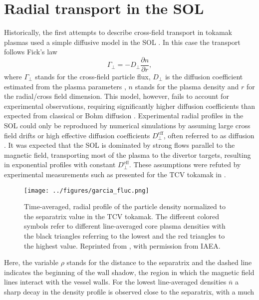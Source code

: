 \section{Radial transport in the SOL}
Historically, the first attempts to describe cross-field transport in tokamak plasmas
used a simple diffusive model in the SOL \cite{connor1999comparison}. In this case the
transport follows Fick's law
\begin{equation}
  \Gamma_\perp = - D_\perp \frac{\partial n}{\partial r},
\end{equation}
%
where $\Gamma_\perp$ stands for the cross-field particle flux, $D_\perp$ is the
diffusion coefficient estimated from the plasma parameters \cite{Bohm1949}, $n$ stands
for the plasma density and $r$ for the radial/cross field dimension. This model,
however, fails to account for experimental observations, requiring significantly higher
diffusion coefficients than expected from classical or Bohm diffusion
\cite{lipschultz2002investigation,krasheninnikov2008recent}. Experimental radial
profiles in the SOL could only be reproduced by numerical simulations by assuming large
cross field drifts or high effective diffusion coefficients $D_\perp^\textrm{eff}$,
often referred to as  diffusion \cite{wesson2011tokamaks}. It was
expected that the SOL is dominated by strong flows parallel to the magnetic field,
transporting most of the plasma to the divertor targets, resulting in exponential
profiles with constant $D_\perp^\textrm{eff}$. These assumptions were refuted by
experimental measurements such as presented for the TCV tokamak in
.
\begin{figure}[t]
  \centering
  \texttt{[image: ../figures/garcia\_fluc.png]}

  \caption{Time-averaged, radial profile of the particle density normalized to the separatrix value in the TCV tokamak. The different colored symbols refer to different line-averaged core plasma densities with the black triangles referring to the lowest and the red triangles to the highest value. Reprinted from \cite{garcia2007fluctuations}, with permission from IAEA.}
  \label{Fig:garcia_fluc}
\end{figure}
%
Here, the variable $\rho$ stands for the distance to the separatrix and the dashed line
indicates the beginning of the wall shadow, the region in which the magnetic field lines
interact with the vessel walls. For the lowest line-averaged densities $\overline{n}$ a
sharp decay in the density profile is observed close to the separatrix, with a much
